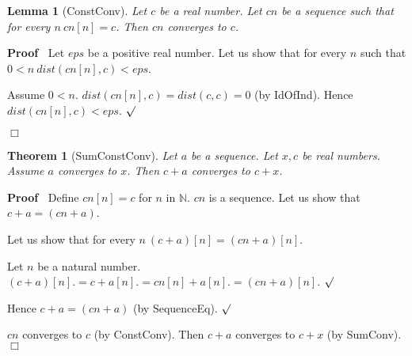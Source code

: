 \documentclass{article}
\newenvironment{forthel}{\begin{leftbar}}{\end{leftbar}}
\newenvironment{proof}{\noindent\textbf{Proof\ }}{\hspace*{\fill}$\Box$\medskip}
\newenvironment{subproof}{\begin{list}{}{}
		\item[\text{Proof}]}{\hfill $\surd$ \end{list}}
\newtheorem{lemma}{Lemma}
\newtheorem{theorem}{Theorem}
\newcommand{\NN}{\mathbb{N}}
\newcommand{\plusone}{+}
\newcommand{\plustwo}{+}
\begin{document}
\begin{forthel}
	\begin{lemma}[ConstConv]
	Let $c$ be a real number. Let $cn$ be a sequence such that for every $n \ cn[n] = c$.
	Then $cn$ converges to $c$.
	\end{lemma}
	\begin{proof}
	Let $eps$ be a positive real number.
	Let us show that for every $n$ such that $0 < n \ dist(cn[n],c) < eps$.
	\begin{subproof}
	Assume $0 < n$.
	$dist(cn[n],c) = dist(c,c) = 0$ (by IdOfInd).
	Hence $dist(cn[n],c) < eps$.
	\end{subproof}
	\end{proof}
	
	\begin{theorem}[SumConstConv]
	Let $a$ be a sequence. Let $x,c$ be real numbers. Assume $a$ converges to $x$.
	Then $c \plustwo a$ converges to $c + x$.
	\end{theorem}
	\begin{proof}
	Define $cn[n] = c$ for $n$ in $\NN$.
	$cn$ is a sequence.
	Let us show that $c \plustwo a = (cn \plusone a)$.
	\begin{subproof}
	Let us show that for every $n \ (c \plustwo a)[n] = (cn \plusone a)[n]$.
	\begin{subproof}
	Let $n$ be a natural number.
	$(c \plustwo a)[n] .= c + a[n]
	.= cn[n] + a[n]
	.= (cn \plusone a)[n]$.
	\end{subproof}
	Hence $c \plustwo a = (cn \plusone a)$ (by SequenceEq).
	\end{subproof}
	$cn$ converges to $c$ (by ConstConv).
	Then $c \plustwo a$ converges to $c + x$ (by SumConv).
	\end{proof}
	

\end{forthel}
\end{document}
